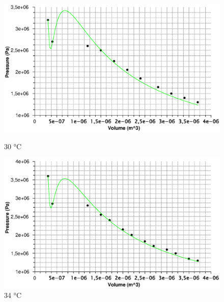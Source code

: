 \documentclass{scrartcl}
\begin{document}
\begin{figure}[!tbp]
  \centering
  \begin{minipage}[b]{0.4\textwidth}
    \includegraphics[width=\textwidth]{vdw30.eps}
    \caption{30 °C}
  \end{minipage}
  \hfill
  \begin{minipage}[b]{0.4\textwidth}
    \includegraphics[width=\textwidth]{vdw34.eps}
    \caption{34 °C}
  \end{minipage}
\end{figure}
\end{document}
